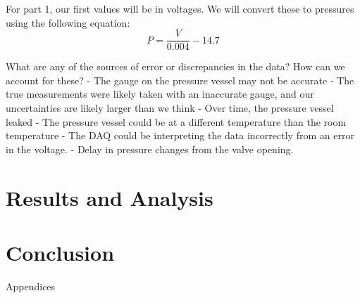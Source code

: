 \documentclass{article}
\begin{document}
For part 1, our first values will be in voltages. We will convert these to pressures using the following equation:
\[
P = \frac{V}{0.004} - 14.7
\]

What are any of the sources of error or discrepancies in the data? How can we account for these?
- The gauge on the pressure vessel may not be accurate
- The true measurements were likely taken with an inaccurate gauge, and our uncertainties are likely larger than we think
- Over time, the pressure vessel leaked
- The pressure vessel could be at a different temperature than the room temperature
- The DAQ could be interpreting the data incorrectly from an error in the voltage.
- Delay in pressure changes from the valve opening.


\section{Results and Analysis}

\section{Conclusion}

\newpage
\thispagestyle{empty}  %
\begin{center}
	\vspace*{\fill}
	{\Huge Appendices}
	\vspace*{\fill}
\end{center}
\end{document}
